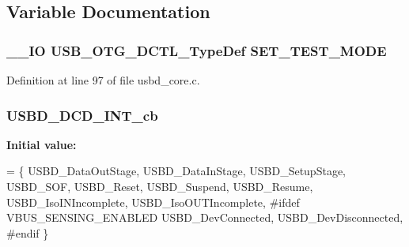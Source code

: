 \subsection{Variable Documentation}
\hypertarget{group___u_s_b_d___c_o_r_e___private___variables_ga77158fc4ea7f97962188de180f2d3b71}{
\subsubsection[{S\-E\-T\-\_\-\-T\-E\-S\-T\-\_\-\-M\-O\-D\-E}]{\setlength{\rightskip}{0pt plus 5cm}\-\_\-\-\_\-\-I\-O {\bf U\-S\-B\-\_\-\-O\-T\-G\-\_\-\-D\-C\-T\-L\-\_\-\-Type\-Def} S\-E\-T\-\_\-\-T\-E\-S\-T\-\_\-\-M\-O\-D\-E}}\label{group___u_s_b_d___c_o_r_e___private___variables_ga77158fc4ea7f97962188de180f2d3b71}


Definition at line 97 of file usbd\-\_\-core.\-c.

\hypertarget{group___u_s_b_d___c_o_r_e___private___variables_gad270c4d127e05c1e09adfd4030a8c678}{
\subsubsection[{U\-S\-B\-D\-\_\-\-D\-C\-D\-\_\-\-I\-N\-T\-\_\-cb}]{ U\-S\-B\-D\-\_\-\-D\-C\-D\-\_\-\-I\-N\-T\-\_\-cb}}\label{group___u_s_b_d___c_o_r_e___private___variables_gad270c4d127e05c1e09adfd4030a8c678}
{\bfseries Initial value\-:}
\begin{DoxyCode}
= 
\{
  USBD\_DataOutStage,
  USBD\_DataInStage,
  USBD\_SetupStage,
  USBD\_SOF,
  USBD\_Reset,
  USBD\_Suspend,
  USBD\_Resume,
  USBD\_IsoINIncomplete,
  USBD\_IsoOUTIncomplete,
\textcolor{preprocessor}{#ifdef VBUS\_SENSING\_ENABLED}
\textcolor{preprocessor}{}USBD\_DevConnected, 
USBD\_DevDisconnected,    
\textcolor{preprocessor}{#endif  }
\textcolor{preprocessor}{\}}
\end{DoxyCode}


